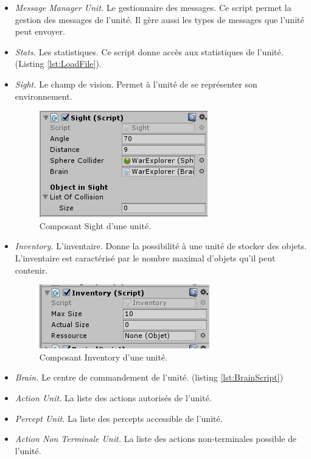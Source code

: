 \documentclass{report}
\begin{document}
\begin{itemize}
\item \textit{Message Manager Unit.} Le gestionnaire des messages.\newline
Ce script permet la gestion des messages de l'unité. Il gère aussi les types de messages que l'unité peut envoyer. 

\item \textit{Stats.} Les statistiques.\newline
Ce script donne accès aux statistiques de l'unité. (Listing \ref{lst:LoadFile}).
\item \textit{Sight.} Le champ de vision.\newline
Permet à l'unité de se représenter son environnement.  
\begin{figure}[!h]
\centering
\includegraphics[scale=0.75]{SightScriptImage}
\caption{Composant Sight d'une unité.}
\end{figure}



\item \textit{Inventory.} L'inventaire.\newline
Donne la possibilité à une unité de stocker des objets. L'inventaire est caractérisé par le nombre maximal d'objets qu'il peut contenir.
\begin{figure}[!h]
\centering
\includegraphics{InventoryImage}
\caption{Composant Inventory d'une unité.}
\end{figure}


\item \textit{Brain.} Le centre de commandement de l'unité. (listing \ref{lst:BrainScript})
\item \textit{Action Unit.} La liste des actions autorisés de l'unité.
\item \textit{Percept Unit.} La liste des percepts accessible de l'unité.
\item \textit{Action Non Terminale Unit.} La liste des actions non-terminales possible de l'unité.
\end{itemize}
\end{document}
